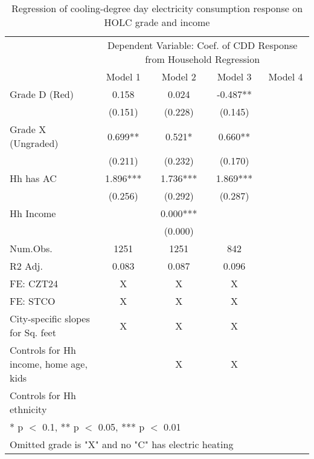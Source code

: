 \documentclass[
]{article}
\begin{document}
\begin{table}

\caption{\label{tab:ResponseOutputec}Regression of cooling-degree day electricity consumption response on HOLC grade and income\label{tab:responseelectric1}}
\centering
\begin{tabular}[t]{lccc>{}c}
\toprule
\multicolumn{1}{c}{ } & \multicolumn{4}{c}{Dependent Variable: Coef. of CDD Response from Household Regression} \\
\cmidrule(l{3pt}r{3pt}){2-5}
  & Model 1 & Model 2 & Model 3 & Model 4\\
\midrule
Grade D (Red) & 0.158 & 0.024 & -0.487** & \cellcolor{blue}{\textcolor{white}{-0.792*}}\\
 & (0.151) & (0.228) & (0.145) & \cellcolor{blue}{\textcolor{white}{(0.391)}}\\
Grade X (Ungraded) & 0.699** & 0.521* & 0.660** & \cellcolor{blue}{\textcolor{white}{0.243}}\\
 & (0.211) & (0.232) & (0.170) & \cellcolor{blue}{\textcolor{white}{(0.361)}}\\
Hh has AC & 1.896*** & 1.736*** & 1.869*** & \cellcolor{blue}{\textcolor{white}{1.727***}}\\
 & (0.256) & (0.292) & (0.287) & \cellcolor{blue}{\textcolor{white}{(0.358)}}\\
Hh Income &  & 0.000*** &  & \cellcolor{blue}{\textcolor{white}{0.000***}}\\
 &  & (0.000) &  & \cellcolor{blue}{\textcolor{white}{(0.000)}}\\
\midrule
Num.Obs. & 1251 & 1251 & 842 & \cellcolor{blue}{\textcolor{white}{776}}\\
R2 Adj. & 0.083 & 0.087 & 0.096 & \cellcolor{blue}{\textcolor{white}{0.103}}\\
FE: CZT24 & X & X & X & \cellcolor{blue}{\textcolor{white}{X}}\\
FE: STCO & X & X & X & \cellcolor{blue}{\textcolor{white}{X}}\\
City-specific slopes for Sq. feet & X & X & X & \cellcolor{blue}{\textcolor{white}{X}}\\
Controls for Hh income, home age, kids &  & X & X & \cellcolor{blue}{\textcolor{white}{X}}\\
Controls for Hh ethnicity &  &  &  & \cellcolor{blue}{\textcolor{white}{X}}\\
\bottomrule
\multicolumn{5}{l}{\textsuperscript{} * p $<$ 0.1, ** p $<$ 0.05, *** p $<$ 0.01}\\
\multicolumn{5}{l}{\textsuperscript{} Omitted grade is "X" and no "C" has electric heating}\\
\end{tabular}
\end{table}
\end{document}
